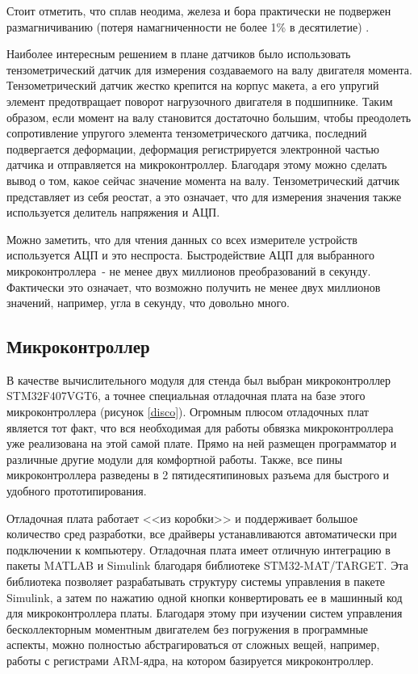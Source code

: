 
Стоит отметить, 
что сплав неодима, железа и бора практически не подвержен размагничиванию 
(потеря намагниченности не более 1\% в десятилетие) \cite{Магстанд}. 

Наиболее интересным решением в плане датчиков было использовать тензометрический датчик
для измерения создаваемого на валу двигателя момента. Тензометрический датчик жестко крепится
на корпус макета, а его упругий элемент предотвращает поворот нагрузочного двигателя в подшипнике.
Таким образом, если момент на валу становится достаточно большим, чтобы преодолеть сопротивление
упругого элемента тензометрического датчика, последний подвергается деформации, деформация 
регистрируется
электронной частью датчика и отправляется на микроконтроллер. Благодаря этому можно сделать вывод
о том, какое сейчас значение момента на валу. Тензометрический датчик представляет из себя
реостат, а это означает, что для измерения значения также используется делитель напряжения и АЦП.

Можно заметить, что для чтения данных со всех измерителе устройств используется АЦП и это неспроста. 
Быстродействие АЦП для выбранного микроконтроллера~- не менее двух миллионов преобразований в секунду.
Фактически это означает, что возможно получить не менее двух миллионов значений, например, 
угла в секунду, что довольно много.

\subsection{Микроконтроллер}

В качестве вычислительного модуля для стенда был выбран микроконтроллер STM32F407VGT6, 
а точнее специальная
отладочная плата на базе этого микроконтроллера (рисунок \ref{disco}). Огромным плюсом 
отладочных плат является тот факт, что
вся необходимая для работы обвязка микроконтроллера уже реализована на этой самой плате.
Прямо на ней размещен программатор и различные другие модули для комфортной работы.
Также, все пины микроконтроллера разведены в 2 пятидесятипиновых разъема для быстрого и удобного 
прототипирования.


Отладочная плата работает <<из коробки>> и поддерживает большое количество сред разработки,
все драйверы устанавливаются автоматически при подключении к компьютеру. Отладочная
плата имеет отличную интеграцию в пакеты MATLAB и Simulink благодаря библиотеке STM32-MAT/TARGET.
Эта библиотека позволяет разрабатывать структуру системы управления в пакете Simulink, а затем 
по нажатию одной кнопки конвертировать ее в машинный код для микроконтроллера платы.
Благодаря этому при изучении систем управления бесколлекторным моментным двигателем без
погружения в программные аспекты,
можно полностью абстрагироваться от сложных вещей, например, работы с регистрами ARM-ядра,
на котором базируется микроконтроллер.

